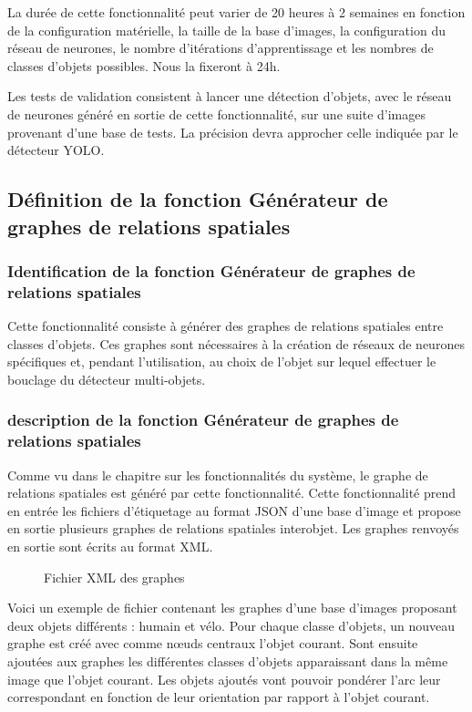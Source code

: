 \documentclass[debug,nodate,hideweeklyreports]{polytech/polytech}
\begin{document}
La durée de cette fonctionnalité peut varier de 20 heures à 2 semaines en fonction de la configuration matérielle, la taille de la base d'images, la configuration du réseau de neurones, le nombre d’itérations d’apprentissage et les nombres de classes d’objets possibles. Nous la fixeront à 24h.

Les tests de validation consistent à lancer une détection d'objets, avec le réseau de neurones généré en sortie de cette fonctionnalité, sur une suite d'images provenant d'une base de tests. La précision devra approcher celle indiquée par le détecteur YOLO.

\subsection{Définition de la fonction Générateur de graphes de relations spatiales}

\subsubsection{Identification de la fonction Générateur de graphes de relations spatiales}

Cette fonctionnalité consiste à générer des graphes de relations spatiales entre classes d’objets. Ces graphes sont nécessaires à la création de réseaux de neurones spécifiques et, pendant l’utilisation, au choix de l’objet sur lequel effectuer le bouclage du détecteur multi-objets.

\subsubsection{description de la fonction Générateur de graphes de relations spatiales}

Comme vu dans le chapitre sur les fonctionnalités du système, le graphe de relations spatiales est généré par cette fonctionnalité.
Cette fonctionnalité prend en entrée les fichiers d’étiquetage au format JSON d’une base d’image et propose en sortie plusieurs graphes de relations spatiales interobjet. Les graphes renvoyés en sortie sont écrits au format XML. 

\begin{figure}
  \caption{Fichier XML des graphes}
  \label{fig:graphxml}
\end{figure}

Voici un exemple de fichier contenant les graphes d’une base d’images proposant deux objets différents : humain et vélo.
Pour chaque classe d’objets, un nouveau graphe est créé avec comme nœuds centraux l’objet courant. Sont ensuite ajoutées aux graphes les différentes classes d’objets apparaissant dans la même image que l’objet courant. Les objets ajoutés vont pouvoir pondérer l’arc leur correspondant en fonction de leur orientation par rapport à l’objet courant.
\end{document}
